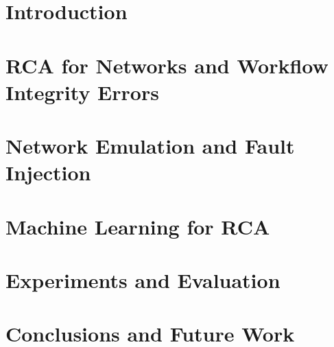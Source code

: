 \documentclass[conference]{IEEEtran}
\begin{document}


\begin{abstract}

\end{abstract}

\section{Introduction}
\label{sec:introduction}


\section{RCA for Networks and Workflow Integrity Errors}
\label{sec:integrity}


\section{Network Emulation and Fault Injection}
\label{sec:emulation}


\section{Machine Learning for RCA}
\label{sec:ml}


\section{Experiments and Evaluation}
\label{sec:evaluation}


\section{Conclusions and Future Work}
\label{sec:future}





%

\end{document}
